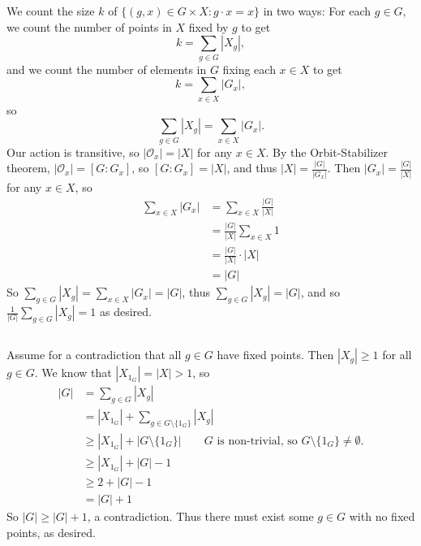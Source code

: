 \documentclass[11pt]{article}
\begin{document}
\renewcommand{\thesubsection}{\thesection.\alph{subsection}}


\section{} %
\subsection{} %
We count the size $k$ of $\{(g,x)\in G\times X:g\cdot x=x\}$ in two ways:
\newline
\newline
For each $g\in G$, we count the number of points in $X$ fixed by $g$ to get
\[k=\sum_{g\in G}|X_g|,\]
and we count the number of elements in $G$ fixing each $x\in X$ to get
\[k=\sum_{x\in X}|G_x|,\]
so
\[\sum_{g\in G}|X_g|=\sum_{x\in X}|G_x|.\]
Our action is transitive, so $|\mathcal O_x|=|X|$ for any $x\in X$. By the
Orbit-Stabilizer theorem, $|\mathcal O_x|=[G:G_x]$, so $[G:G_x]=|X|$, and thus
$|X|=\frac{|G|}{|G_x|}$. Then $|G_x|=\frac{|G|}{|X|}$ for any $x\in X$, so
\begin{align*}
	\sum_{x\in X}|G_x|&=\sum_{x\in X}\frac{|G|}{|X|}\\
	&=\frac{|G|}{|X|}\sum_{x\in X}1\\
	&=\frac{|G|}{|X|}\cdot|X|\\
	&=|G|
\end{align*}
So $\sum_{g\in G}|X_g|=\sum_{x\in X}|G_x|=|G|$, thus $\sum_{g\in G}|X_g|=|G|$,
and so $\frac{1}{|G|}\sum_{g\in G}|X_g|=1$ as desired.


\subsection{} %
Assume for a contradiction that all $g\in G$ have fixed points. Then
$|X_g|\ge1$ for all $g\in G$. We know that $|X_{1_G}|=|X|>1$, so
\begin{align*}
	|G|&=\sum_{g\in G}|X_g|\\
	&=|X_{1_G}|+\sum_{g\in G\setminus\{1_G\}}|X_g|\\
	&\ge|X_{1_G}|+|G\setminus\{1_G\}|\qquad{\text{$G$ is non-trivial, so $G\setminus\{1_G\}\neq\emptyset$.}}\\
	&\ge|X_{1_G}|+|G|-1\\
	&\ge2+|G|-1\\
	&=|G|+1
\end{align*}
So $|G|\ge|G|+1$, a contradiction. Thus there must exist some $g\in G$ with no
fixed points, as desired.
\end{document}
